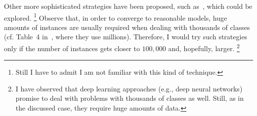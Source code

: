 \documentclass[11pt]{article}
\begin{document}
Other more sophisticated strategies have been proposed, such 
as~\cite{JMLR:v15:gupta14a}, which could be explored.%
\footnote{Still I have to admit I am not familiar with this kind of technique.}
Observe that, in order to converge to reasonable models, huge amounts of 
instances are usually required when dealing with thousands of classes (cf. 
Table~4 in~\cite{JMLR:v15:gupta14a}, where they use millions). Therefore, I 
would try such strategies only if the number of instances gets closer to 
$100,000$ and, hopefully, larger.%
\footnote{I have observed that deep learning approaches (e.g., deep 
neural networks) promise to deal with problems with thousands of classes as 
well. Still, as in the discussed case, they require huge amounts of 
data.}

%
% 

%
%
\end{document}
